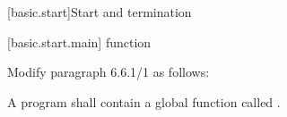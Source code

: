 \setcounter{section}{5}
[basic.start]{Start and termination}

\setcounter{subsection}{0}
[basic.start.main]{ function}

Modify paragraph 6.6.1/1 as follows:
\begin{std.txt}
  \resetalinea[0]
  \alinea
  A program shall contain a global function called 
  .
\end{std.txt}

